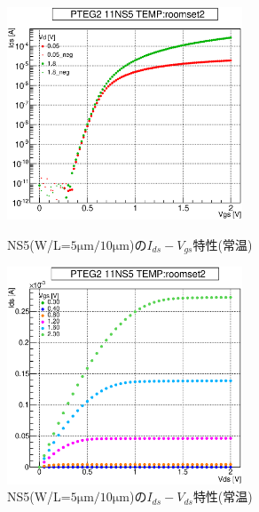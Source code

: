 				\begin{figure}[htbp]
					\begin{minipage}{0.5\hsize}
						\begin{center}
							\includegraphics[width=70mm]{./Chapter/Appendix/Picture/NST/NS5/PTEG2_11_NS5_IdVg_roomset2.eps}
						\end{center}
						\caption{NS5(W/L=$5\mathrm{\mu m}/10\mathrm{\mu m}$)の$I_{ds}-V_{gs}$特性(常温)}
						\label{fig:NS5_IdVg_room}
					\end{minipage}
					\begin{minipage}{0.5\hsize}
						\begin{center}
							\includegraphics[width=70mm]{./Chapter/Appendix/Picture/NST/NS5/PTEG2_11_NS5_IdVd_roomset2.eps}
						\end{center}
						\caption{NS5(W/L=$5\mathrm{\mu m}/10\mathrm{\mu m}$)の$I_{ds}-V_{ds}$特性(常温)}
						\label{fig:NS5_IdVd_room}
					\end{minipage}
				\end{figure}
